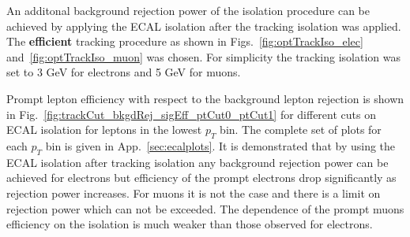 \documentclass{cmspaper}
\begin{document}
An additonal background rejection power of the isolation procedure can be achieved by applying the ECAL
isolation after the tracking isolation was applied. The {\bf efficient} tracking procedure
as shown in Figs.~\ref{fig:optTrackIso_elec} and~\ref{fig:optTrackIso_muon} was chosen.
For simplicity the tracking isolation was set
to 3 GeV for electrons and 5 GeV for muons.

Prompt lepton efficiency with respect to the background lepton rejection is shown in
Fig.~\ref{fig:trackCut_bkgdRej_sigEff_ptCut0_ptCut1} for different cuts on ECAL isolation
for leptons in the lowest $p_T$ bin.
The complete set of plots for each $p_T$ bin is given in App.~\ref{sec:ecalplots}.
 It is demonstrated that by using the ECAL
isolation after tracking isolation any background rejection power
can be achieved for electrons but efficiency of the prompt electrons drop significantly
as rejection power increases.
For muons it is not the case and there is a limit on rejection power which can not
be exceeded. The dependence of the prompt muons efficiency on the isolation is much
weaker than those observed for electrons.

\end{document}
